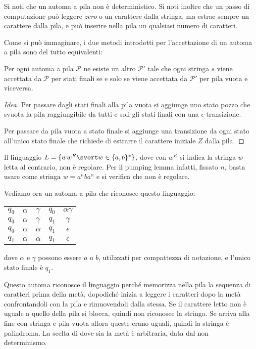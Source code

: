 \documentclass[12pt]{article}
\numberwithin{theorem}{subsection}
\begin{document}
Si noti che un automa a pila non è deterministico. Si noti inoltre che un passo di computazione può leggere \textit{zero} o un carattere dalla stringa, ma estrae sempre un carattere dalla pila, e può inserire nella pila un qualsiasi numero di caratteri.

Come si può immaginare, i due metodi introdotti per l'accettazione di un automa a pila sono del tutto equivalenti:

\begin{theorem}
	Per ogni automa a pila $\mathcal{P}$ ne esiste un altro $\mathcal{P}'$ tale che ogni stringa $s$ viene accettata da $\mathcal{P}$ per stati finali se e solo se viene accettata da $\mathcal{P}'$ per pila vuota e viceversa.
\end{theorem}
\begin{proof}[Idea]
	Per passare dagli stati finali alla pila vuota si aggiunge uno stato pozzo che svuota la pila raggiungibile da tutti e soli gli stati finali con una $\epsilon$-transizione.
	
	Per passare da pila vuota a stato finale si aggiunge una transizione da ogni stato all'unico stato finale che richiede di estrarre il carattere iniziale $Z$ dalla pila.
\end{proof}

\begin{example}
	Il linguaggio $L = \{ ww^R \svert w \in \{ a, b \}^* \}$, dove con $w^R$ si indica la stringa $w$ letta al contrario, non è regolare. Per il pumping lemma infatti, fissato $n$, basta usare come stringa $w = a^nba^n$ e si verifica che non è regolare.
	
	Vediamo ora un automa a pila che riconosce questo linguaggio:

	\vspace{0.2cm}
	\begin{tabular}{ *{3}{c} | *{2}{c} }
		$q_0$ & $\alpha$ & $\gamma$ & $q_0$ & $\alpha \gamma$ \\
		$q_0$ & $\alpha$ & $\gamma$ & $q_1$ & $\gamma$ \\
		$q_0$ & $\alpha$ & $\alpha$ & $q_1$ & $\epsilon$ \\
		$q_1$ & $\alpha$ & $\alpha$ & $q_1$ & $\epsilon$ \\
	\end{tabular}
	\vspace{0.2cm}

	dove $\alpha$ e $\gamma$ possono essere $a$ o $b$, utilizzati per compattezza di notazione, e l'unico stato finale è $q_1$.
	
	Questo automa riconosce il linguaggio perché memorizza nella pila la sequenza di caratteri prima della metà, dopodiché inizia a leggere i caratteri dopo la metà confrontandoli con la pila e rimuovendoli dalla stessa. Se il carattere letto non è uguale a quello della pila si blocca, quindi non riconosce la stringa. Se arriva alla fine con stringa e pila vuota allora queste erano uguali, quindi la stringa è palindroma. La scelta di dove sia la metà è arbitraria, data dal non determinismo.
\end{example}
\end{document}
